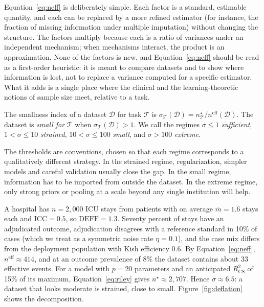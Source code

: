 \documentclass[acmsmall,screen,review]{acmart}
\newcommand{\eff}{\mathrm{eff}}
\theoremstyle{acmdefinition}
\begin{document}
Equation~\eqref{eq:neff} is deliberately simple. Each factor is a standard, estimable quantity, and each can be replaced by a more refined estimator (for instance, the fraction of missing information under multiple imputation) without changing the structure. The factors multiply because each is a ratio of variances under an independent mechanism; when mechanisms interact, the product is an approximation. None of the factors is new, and Equation~\eqref{eq:neff} should be read as a first-order heuristic: it is meant to compare datasets and to show where information is lost, not to replace a variance computed for a specific estimator. What it adds is a single place where the clinical and the learning-theoretic notions of sample size meet, relative to a task.

\begin{definition}\label{def:smallness}
The smallness index of a dataset $\mathcal{D}$ for task $\mathcal{T}$ is $\sigma_{\mathcal{T}}(\mathcal{D})=n^{\star}_{\mathcal{T}}/n^{\eff}(\mathcal{D})$. The dataset is \emph{small for} $\mathcal{T}$ when $\sigma_{\mathcal{T}}(\mathcal{D})>1$. We call the regimes $\sigma\le 1$ \emph{sufficient}, $1<\sigma\le 10$ \emph{strained}, $10<\sigma\le 100$ \emph{small}, and $\sigma>100$ \emph{extreme}.
\end{definition}

The thresholds are conventions, chosen so that each regime corresponds to a qualitatively different strategy. In the strained regime, regularization, simpler models and careful validation usually close the gap. In the small regime, information has to be imported from outside the dataset. In the extreme regime, only strong priors or pooling at a scale beyond any single institution will help.

\begin{example}\label{ex:icu}
A hospital has $n=2{,}000$ ICU stays from patients with on average $\bar{m}=1.6$ stays each and $\mathrm{ICC}=0.5$, so $\mathrm{DEFF}=1.3$. Seventy percent of stays have an adjudicated outcome, adjudication disagrees with a reference standard in 10\% of cases (which we treat as a symmetric noise rate $\eta=0.1$), and the case mix differs from the deployment population with Kish efficiency $0.6$. By Equation~\eqref{eq:neff}, $n^{\eff}\approx 414$, and at an outcome prevalence of 8\% the dataset contains about 33 effective events. For a model with $p=20$ parameters and an anticipated $R^2_{\mathrm{CS}}$ of 15\% of its maximum, Equation~\eqref{eq:riley} gives $n^{\star}\approx 2{,}707$. Hence $\sigma\approx 6.5$: a dataset that looks moderate is strained, close to small. Figure~\ref{fig:deflation} shows the decomposition.
\end{example}
\end{document}
